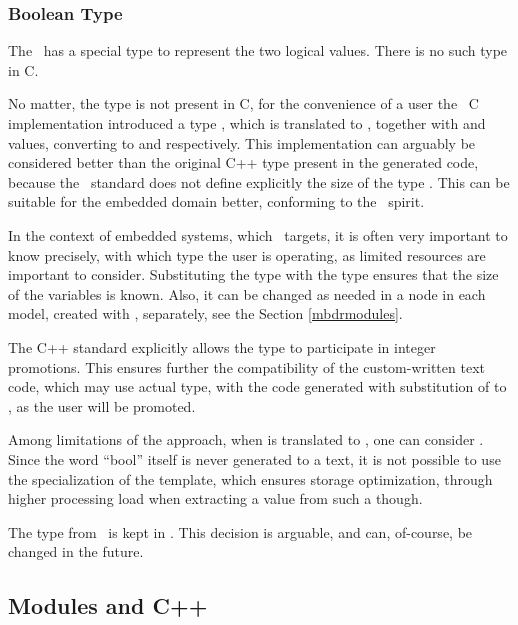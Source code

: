 \subsubsection{Boolean Type}

The \cpppl\ has a special  type to represent the two logical values. There is no such type in C.

No matter, the  type is not present in C, for the convenience of a user the \mb\ C implementation introduced a type ,
which is translated to , together with  and  values, converting to  and  respectively.
This implementation can arguably be considered better than the original C++  type present in the generated code, because the \cpppl\ standard
does not define explicitly the size of the  type \cite{cpp11}. This can be suitable for the embedded domain better, conforming to the
\mbdr\ spirit.

In the context of embedded systems, which \mbdr\ targets, it is often very important to 
know precisely, with which type the user is operating, as limited resources
are important to consider. Substituting the  type with the  type ensures that the size of 
the  variables is known. Also, it can be changed as needed in a 
 node in each model, created with \mb, separately, see the Section \ref{mbdrmodules}.

The C++ standard explicitly allows the  type to participate in integer promotions. 
This ensures further the compatibility of the custom-written text code, which may use actual 
 type, with the code generated with substitution of  to , 
as the user  will be promoted.

Among limitations of the approach, when  is translated to , one can consider . 
Since the word ``bool'' itself is never generated to a text, it is not possible to use the specialization 
of the template, which ensures storage optimization, through higher processing load when
extracting a value from such a  though.

The  type from \mbdr\ is kept in \pcpp. This decision is arguable, and can, of-course, be
changed in the future.

\subsection{Modules and C++}

